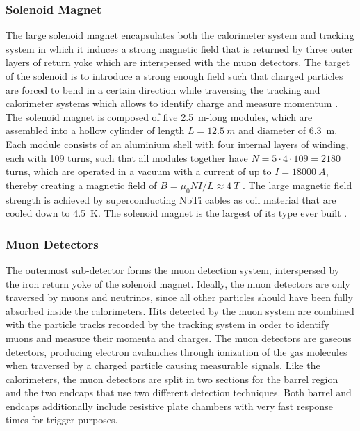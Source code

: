 \documentclass[../../main.tex]{subfiles}
\begin{document}
\subsubsection*{\underline{Solenoid Magnet}}
The large solenoid magnet encapsulates both the calorimeter system and tracking system in which it induces a strong magnetic field that is returned by three outer layers of return yoke which are interspersed with the muon detectors. The target of the solenoid is to introduce a strong enough field such that charged particles are forced to bend in a certain direction while traversing the tracking and calorimeter systems which allows to identify charge and measure momentum \cite{Collaboration_2008,Bayatian:922757}. The solenoid magnet is composed of five \SI{2.5}{m}-long modules, which are assembled into a hollow cylinder of length $L=\SI{12.5}{m}$ and diameter of \SI{6.3}{m}. Each module consists of an aluminium shell with four internal layers of winding, each with 109 turns, such that all modules together have $N=5\cdot4\cdot109=2180$ turns, which are operated in a vacuum with a current of up to $I=\SI{18000}{A}$, thereby creating a magnetic field of $B=\mu_0NI/L\approx\SI{4}{T}$ \cite{solenoid}. The large magnetic field strength is achieved by superconducting NbTi cables as coil material that are cooled down to \SI{4.5}{K}. The solenoid magnet is the largest of its type ever built \cite{about_cms}.

\subsubsection*{\underline{Muon Detectors}}
The outermost sub-detector forms the muon detection system, interspersed by the iron return yoke of the solenoid magnet. Ideally, the muon detectors are only traversed by muons and neutrinos, since all other particles should have been fully absorbed inside the calorimeters. Hits detected by the muon system are combined with the particle tracks recorded by the tracking system in order to identify muons and measure their momenta and charges. The muon detectors are gaseous detectors, producing electron avalanches through ionization of the gas molecules when traversed by a charged particle causing measurable signals. Like the calorimeters, the muon detectors are split in two sections for the barrel region and the two endcaps that use two different detection techniques. Both barrel and endcaps additionally include resistive plate chambers with very fast response times for trigger purposes.
\end{document}

